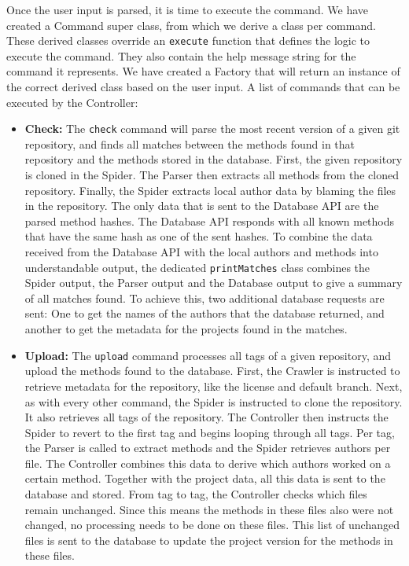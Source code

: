 \documentclass[../Main.tex]{subfiles}
\begin{document}
Once the user input is parsed, it is time to execute the command. We have created a Command super class, from which we derive a class per command. These derived classes override an \texttt{execute} function that defines the logic to execute the command. They also contain the help message string for the command it represents. We have created a Factory that will return an instance of the correct derived class based on the user input. 
A list of commands that can be executed by the Controller:
\begin{itemize}
\item \textbf{Check:} The \texttt{check} command will parse the most recent version of a given git repository, and finds all matches between the methods found in that repository and the methods stored in the database. First, the given repository is cloned in the Spider. The Parser then extracts all methods from the cloned repository. Finally, the Spider extracts local author data by blaming the files in the repository. The only data that is sent to the Database API are the parsed method hashes. The Database API responds with all known methods that have the same hash as one of the sent hashes. To combine the data received from the Database API with the local authors and methods into understandable output, the dedicated \texttt{printMatches} class combines the Spider output, the Parser output and the Database output to give a summary of all matches found. To achieve this, two additional database requests are sent: One to get the names of the authors that the database returned, and another to get the metadata for the projects found in the matches.
\item \textbf{Upload:} The \texttt{upload} command processes all tags of a given repository, and upload the methods found to the database. First, the Crawler is instructed to retrieve metadata for the repository, like the license and default branch. Next, as with every other command, the Spider is instructed to clone the repository. It also retrieves all tags of the repository. The Controller then instructs the Spider to revert to the first tag and begins looping through all tags. Per tag, the Parser is called to extract methods and the Spider retrieves authors per file. The Controller combines this data to derive which authors worked on a certain method. Together with the project data, all this data is sent to the database and stored. From tag to tag, the Controller checks which files remain unchanged. Since this means the methods in these files also were not changed, no processing needs to be done on these files. This list of unchanged files is sent to the database to update the project version for the methods in these files.

\end{itemize}
\end{document}
